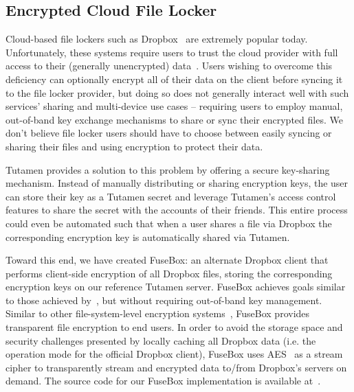 \subsection{Encrypted Cloud File Locker}

Cloud-based file lockers such as Dropbox~\cite{dropbox} are extremely
popular today. Unfortunately, these systems require users to trust the
cloud provider with full access to their (generally unencrypted)
data~\cite{vintsurf-dropbox}. Users wishing to overcome this
deficiency can optionally encrypt all of their data on the client
before syncing it to the file locker provider, but doing so does not
generally interact well with such services' sharing and multi-device
use cases -- requiring users to employ manual, out-of-band key
exchange mechanisms to share or sync their encrypted files. We don't
believe file locker users should have to choose between easily syncing
or sharing their files and using encryption to protect their data.

Tutamen provides a solution to this problem by offering a secure
key-sharing mechanism. Instead of manually distributing or sharing
encryption keys, the user can store their key as a Tutamen secret and
leverage Tutamen's access control features to share the secret with
the accounts of their friends. This entire process could even be
automated such that when a user shares a file via Dropbox the
corresponding encryption key is automatically shared via Tutamen.

Toward this end, we have created FuseBox: an alternate Dropbox client
that performs client-side encryption of all Dropbox files, storing the
corresponding encryption keys on our reference Tutamen server. FuseBox
achieves goals similar to those achieved by~\cite{goh2003}, but
without requiring out-of-band key management. Similar to other
file-system-level encryption systems~\cite{blaze1993, Cattaneo2001,
  halcrow}, FuseBox provides transparent file encryption to end
users. In order to avoid the storage space and security challenges
presented by locally caching all Dropbox data (i.e. the operation mode
for the official Dropbox client), FuseBox uses AES~\cite{daemen1999,
  nist2001} as a stream cipher to transparently stream and encrypted
data to/from Dropbox's servers on demand.  The source code for our
FuseBox implementation is available at~\cite{fusebox}.

